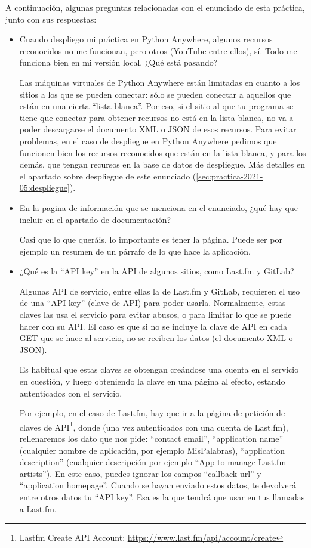 A continuación, algunas preguntas relacionadas con el enunciado de esta práctica, junto con sus respuestas:

\begin{itemize}

\item Cuando despliego mi práctica en Python Anywhere, algunos recursos reconocidos no me funcionan, pero otros (YouTube entre ellos), sí. Todo me funciona bien en mi versión local. ¿Qué está pasando?

  Las máquinas virtuales de Python Anywhere están limitadas en cuanto a los sitios a los que se pueden conectar: sólo se pueden conectar a aquellos que están en una cierta ``lista blanca''. Por eso, si el sitio al que tu programa se tiene que conectar para obtener recursos no está en la lista blanca, no va a poder descargarse el documento XML o JSON de esos recursos. Para evitar problemas, en el caso de despliegue en Python Anywhere pedimos que funcionen bien los recursos reconocidos que están en la lista blanca, y para los demás, que tengan recursos en la base de datos de despliegue. Más detalles en el apartado sobre despliegue de este enunciado (\ref{sec:practica-2021-05:despliegue}).
  
\item En la pagina de información que se menciona en el enunciado, ¿qué hay que incluir en el apartado de documentación?

Casi que lo que queráis, lo importante es tener la página. Puede ser por ejemplo un resumen de un párrafo de lo que hace la aplicación.

\item ¿Qué es la ``API key'' en la API de algunos sitios, como Last.fm y GitLab?
\label{sec:practica-2021-05:preguntas-apikey}

  Algunas API de servicio, entre ellas la de Last.fm y GitLab, requieren el uso de una ``API key'' (clave de API) para poder usarla. Normalmente, estas claves las usa el servicio para evitar abusos, o para limitar lo que se puede hacer con su API. El caso es que si no se incluye la clave de API en cada GET que se hace al servicio, no se reciben los datos (el documento XML o JSON).

  Es habitual que estas claves se obtengan creándose una cuenta en el servicio en cuestión, y luego obteniendo la clave en una página al efecto, estando autenticados con el servicio.

  Por ejemplo, en el caso de Last.fm, hay que ir a la página de petición de claves de API\footnote{Lastfm Create API Account: \url{https://www.last.fm/api/account/create}}, donde (una vez autenticados con una cuenta de Last.fm), rellenaremos los dato que nos pide: ``contact email'', ``application name'' (cualquier nombre de aplicación, por ejemplo MisPalabras), ``application description'' (cualquier descripción por ejemplo ``App to manage Last.fm artists''). En este caso, puedes ignorar los campos ``callback url'' y ``application homepage''. Cuando se hayan enviado estos datos, te devolverá entre otros datos tu ``API key''. Esa es la que tendrá que usar en tus llamadas a Last.fm.


\end{itemize}
